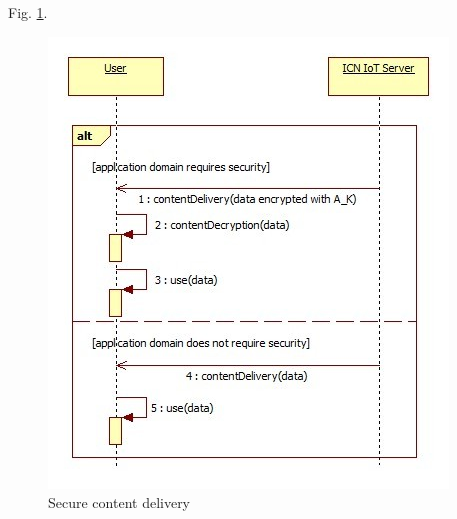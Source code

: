 Fig. \ref{fig:Secure content delivery}.
 \begin{figure}[ht]
	\centering
	\includegraphics[width=\linewidth]{Figures/Secure-content-delivery-user.png}
	\caption[]{Secure content delivery}
	\label{fig:Secure content delivery}
\end{figure}
\par
